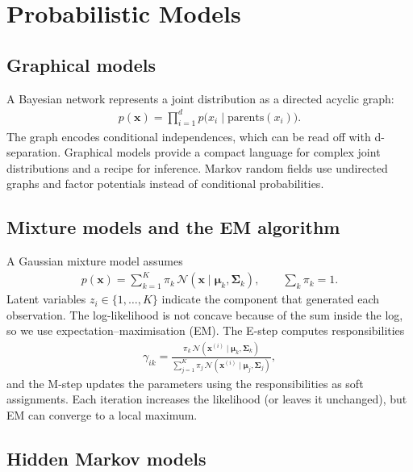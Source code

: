 \documentclass[a4paper, 12pt]{book}
\begin{document}

\chapter{Probabilistic Models}
\label{ch:probmodels}

\section{Graphical models}

A Bayesian network represents a joint distribution as a directed acyclic graph:
\begin{align}
    p(\mathbf{x}) = \prod_{i=1}^d p\big(x_i \mid \mathrm{parents}(x_i)\big).
\end{align}
The graph encodes conditional independences, which can be read off with
d-separation. Graphical models provide a compact language for complex joint
distributions and a recipe for inference. Markov random fields use undirected graphs
and factor potentials instead of conditional probabilities.

\section{Mixture models and the EM algorithm}

A Gaussian mixture model assumes
\begin{align}
    p(\mathbf{x}) = \sum_{k=1}^K \pi_k\,\mathscr{N}(\mathbf{x}\mid
    \boldsymbol{\mu}_k,\boldsymbol{\Sigma}_k),
    \qquad \sum_k \pi_k = 1.
\end{align}
Latent variables $z_i \in \{1,\ldots,K\}$ indicate the component that generated each
observation. The log-likelihood is not concave because of the sum inside the log, so
we use expectation--maximisation (EM). The E-step computes responsibilities
\begin{align}
    \gamma_{ik} = \frac{\pi_k\,\mathscr{N}(\mathbf{x}^{(i)}\mid\boldsymbol{\mu}_k,
    \boldsymbol{\Sigma}_k)}{\sum_{j=1}^K \pi_j\,\mathscr{N}(\mathbf{x}^{(i)}\mid
    \boldsymbol{\mu}_j,\boldsymbol{\Sigma}_j)},
\end{align}
and the M-step updates the parameters using the responsibilities as soft assignments.
Each iteration increases the likelihood (or leaves it unchanged), but EM can converge
to a local maximum.

\section{Hidden Markov models}
\end{document}
